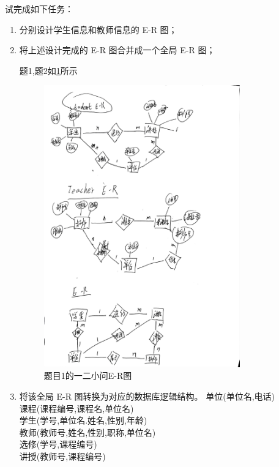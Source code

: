 \documentclass[a4paper,12pt,UTF8,fontset=none]{ctexart}
\begin{document}
   试完成如下任务：
   
   \begin{enumerate}
       \item 分别设计学生信息和教师信息的 E-R 图；
       \item 将上述设计完成的 E-R 图合并成一个全局 E-R 图；
       \par 题1,题2如\cref{图5-1}所示
       \FloatBarrier
       \begin{figure}[htbp]
        \centering
        \includegraphics[width=0.8\textwidth]{./images/题1-E-R图.jpg}
        \caption{题目1的一二小问E-R图}
        \label{图5-1}
    \end{figure}
    \FloatBarrier
       \item 将该全局 E-R 图转换为对应的数据库逻辑结构。
      单位(单位名,电话)\\
      课程(课程编号,课程名,单位名)\\
      学生(学号,单位名.姓名,性别,年龄)\\
      教师(教师号,姓名,性别,职称,单位名)\\
      选修(学号,课程编号)\\
      讲授(教师号,课程编号)\\
   \end{enumerate}
\end{document}

